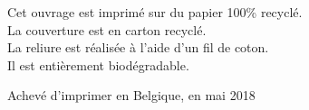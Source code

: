 \begin{center}

    Cet ouvrage est imprimé sur du papier 100\% recyclé.\\
    La couverture est en carton recyclé.\\
    La reliure est réalisée à l'aide d'un fil de coton.\\
    Il est entièrement biodégradable.


    Achevé d'imprimer en Belgique, en mai 2018


    

\end{center}
